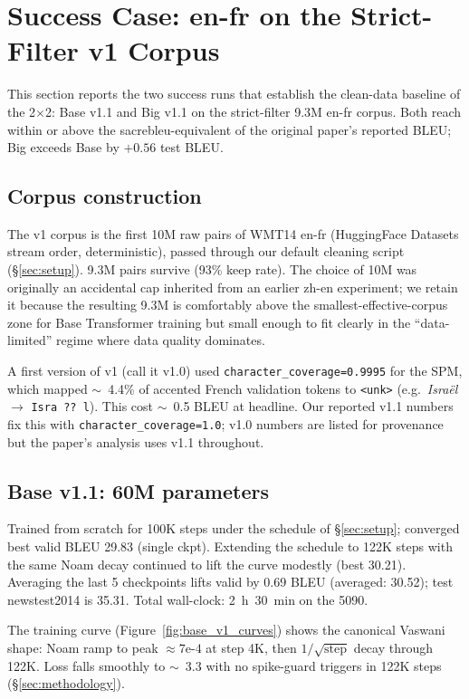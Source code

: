 \section{Success Case: en-fr on the Strict-Filter v1 Corpus}
\label{sec:enfr_v1}

This section reports the two success runs that establish the clean-data baseline of the 2$\times$2: Base v1.1 and Big v1.1 on the strict-filter 9.3M en-fr corpus. Both reach within or above the sacrebleu-equivalent of the original paper's reported BLEU; Big exceeds Base by $+0.56$ test BLEU.

\subsection{Corpus construction}
\label{sec:v1_corpus}
The v1 corpus is the first 10M raw pairs of WMT14 en-fr (HuggingFace Datasets stream order, deterministic), passed through our default cleaning script (\S\ref{sec:setup}). 9.3M pairs survive (93\% keep rate). The choice of 10M was originally an accidental cap inherited from an earlier zh-en experiment; we retain it because the resulting 9.3M is comfortably above the smallest-effective-corpus zone for Base Transformer training but small enough to fit clearly in the ``data-limited'' regime where data quality dominates.

A first version of v1 (call it v1.0) used \texttt{character\_coverage=0.9995} for the SPM, which mapped $\sim$~4.4\% of accented French validation tokens to \texttt{<unk>} (e.g.\ \textit{Israël} $\rightarrow$ \texttt{Isra ?? l}). This cost $\sim$~0.5 BLEU at headline. Our reported v1.1 numbers fix this with \texttt{character\_coverage=1.0}; v1.0 numbers are listed for provenance but the paper's analysis uses v1.1 throughout.

\subsection{Base v1.1: 60M parameters}
\label{sec:base_v1}
Trained from scratch for 100K steps under the schedule of \S\ref{sec:setup}; converged best valid BLEU 29.83 (single ckpt). Extending the schedule to 122K steps with the same Noam decay continued to lift the curve modestly (best 30.21). Averaging the last 5 checkpoints lifts valid by 0.69 BLEU (averaged: 30.52); test newstest2014 is 35.31. Total wall-clock: 2~h~30~min on the 5090.

The training curve (Figure~\ref{fig:base_v1_curves}) shows the canonical Vaswani shape: Noam ramp to peak $\approx 7\text{e-}4$ at step 4K, then $1/\sqrt{\text{step}}$ decay through 122K. Loss falls smoothly to $\sim$~3.3 with no spike-guard triggers in 122K steps (\S\ref{sec:methodology}).

